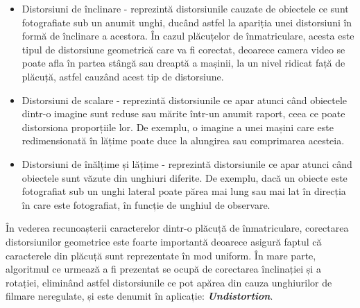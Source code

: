 \documentclass[12pt]{article}
\begin{document}
\begin{itemize}
    \item Distorsiuni de \^{i}nclinare - reprezint\u{a} distorsiunile cauzate de obiectele ce sunt fotografiate sub un anumit unghi, duc\^{a}nd astfel la apariția unei distorsiuni \^{i}n form\u{a} de \^{i}nclinare a acestora. \^{I}n cazul pl\u{a}cuțelor de \^{i}nmatriculare, acesta este tipul de distorsiune geometric\u{a} care va fi corectat, deoarece camera video se poate afla \^{i}n partea st\^{a}ng\u{a} sau dreapt\u{a} a mașinii, la un nivel ridicat faț\u{a} de pl\u{a}cuț\u{a}, astfel cauz\^{a}nd acest tip de distorsiune.
    \item Distorsiuni de scalare - reprezint\u{a} distorsiunile ce apar atunci c\^{a}nd obiectele dintr-o imagine sunt reduse sau m\u{a}rite \^{i}ntr-un anumit raport, ceea ce poate distorsiona proporțiile lor. De exemplu, o imagine a unei mașini care este redimensionat\u{a} \^{i}n l\u{a}țime poate duce la alungirea sau comprimarea acesteia.
    \item Distorsiuni de \^{i}n\u{a}lțime și l\u{a}țime - reprezint\u{a} distorsiunile ce apar atunci c\^{a}nd obiectele sunt v\u{a}zute din unghiuri diferite. De exemplu, dac\u{a} un obiecte este fotografiat sub un unghi lateral poate p\u{a}rea mai lung sau mai lat \^{i}n direcția \^{i}n care este fotografiat, \^{i}n funcție de unghiul de observare.
\end{itemize}

\^{I}n vederea recunoașterii caracterelor dintr-o pl\u{a}cuț\u{a} de \^{i}nmatriculare, corectarea distorsiunilor geometrice este foarte important\u{a} deoarece asigur\u{a} faptul c\u{a} caracterele din pl\u{a}cuț\u{a} sunt reprezentate \^{i}n mod uniform. \^{I}n mare parte, algoritmul ce urmeaz\u{a} a fi prezentat se ocup\u{a} de corectarea \^{i}nclinației și a rotației, elimin\^{a}nd astfel distorsiunile ce pot ap\u{a}rea din cauza unghiurilor de filmare neregulate, și este denumit \^{i}n aplicație: \textbf{\textit{Undistortion}}.
\end{document}
